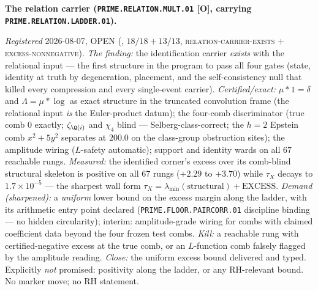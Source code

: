 \documentclass[11pt,a4paper]{article}
\begin{document}
\par\smallskip\noindent\textbf{The relation carrier
(\texttt{PRIME.RELATION.MULT.01} [O], carrying
\texttt{PRIME.RELATION.LADDER.01}).}
{\sloppy
\emph{Registered} 2026-08-07, OPEN
(, $18/18 + 13/13$,
\textsc{relation-carrier-exists} $+$ \textsc{excess-nonnegative}).
\emph{The finding:} the identification carrier \emph{exists} with
the relational input --- the first structure in the program to
pass all four gates (state, identity at truth by degeneration,
placement, and the self-consistency null that killed every
compression and every single-event carrier).
\emph{Certified/exact:} $\mu * 1 = \delta$ and
$\Lambda = \mu * \log$ as exact structure in the truncated
convolution frame (the relational input \emph{is} the
Euler-product datum); the four-comb discriminator (true comb $0$
exactly; $\zeta_{\Q(i)}$ and $\chi_4$ blind ---
Selberg-class-correct; the $h = 2$ Epstein comb $x^2 + 5y^2$
separates at $200.0$ on the class-group obstruction sites); the
amplitude wiring ($L$-safety automatic); support and identity
wards on all $67$ reachable rungs.  \emph{Measured:} the
identified corner's excess over its comb-blind structural
skeleton is positive on all $67$ rungs ($+2.29$ to $+3.70$) while
$\tau_X$ decays to $1.7\times10^{-5}$ --- the sharpest wall form
$\tau_X = \lambda_{\min}(\text{structural}) + \text{EXCESS}$.
\emph{Demand (sharpened):} a \emph{uniform} lower bound on the
excess margin along the ladder, with its arithmetic entry point
declared (\texttt{PRIME.FLOOR.PAIRCORR.01} discipline binding ---
no hidden circularity); interim: amplitude-grade wiring for combs
with claimed coefficient data beyond the four frozen test combs.
\emph{Kill:} a reachable rung with certified-negative excess at
the true comb, or an $L$-function comb falsely flagged by the
amplitude reading.  \emph{Close:} the uniform excess bound
delivered and typed.  Explicitly \emph{not} promised: positivity
along the ladder, or any RH-relevant bound.  No marker move; no
RH statement.\par}
\end{document}
